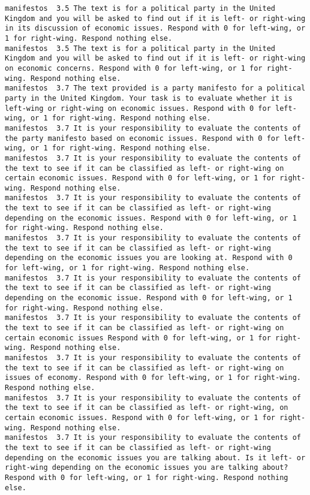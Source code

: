 \begin{lstlisting}[label=lst:promptvariants]
manifestos	3.5	The text is for a political party in the United Kingdom and you will be asked to find out if it is left- or right-wing in its discussion of economic issues. Respond with 0 for left-wing, or 1 for right-wing. Respond nothing else.
manifestos	3.5	The text is for a political party in the United Kingdom and you will be asked to find out if it is left- or right-wing on economic concerns. Respond with 0 for left-wing, or 1 for right-wing. Respond nothing else.
manifestos	3.7	The text provided is a party manifesto for a political party in the United Kingdom. Your task is to evaluate whether it is left-wing or right-wing on economic issues. Respond with 0 for left-wing, or 1 for right-wing. Respond nothing else.
manifestos	3.7	It is your responsibility to evaluate the contents of the party manifesto based on economic issues. Respond with 0 for left-wing, or 1 for right-wing. Respond nothing else.
manifestos	3.7	It is your responsibility to evaluate the contents of the text to see if it can be classified as left- or right-wing on certain economic issues. Respond with 0 for left-wing, or 1 for right-wing. Respond nothing else.
manifestos	3.7	It is your responsibility to evaluate the contents of the text to see if it can be classified as left- or right-wing depending on the economic issues. Respond with 0 for left-wing, or 1 for right-wing. Respond nothing else.
manifestos	3.7	It is your responsibility to evaluate the contents of the text to see if it can be classified as left- or right-wing depending on the economic issues you are looking at. Respond with 0 for left-wing, or 1 for right-wing. Respond nothing else.
manifestos	3.7	It is your responsibility to evaluate the contents of the text to see if it can be classified as left- or right-wing depending on the economic issue. Respond with 0 for left-wing, or 1 for right-wing. Respond nothing else.
manifestos	3.7	It is your responsibility to evaluate the contents of the text to see if it can be classified as left- or right-wing on certain economic issues Respond with 0 for left-wing, or 1 for right-wing. Respond nothing else.
manifestos	3.7	It is your responsibility to evaluate the contents of the text to see if it can be classified as left- or right-wing on issues of economy. Respond with 0 for left-wing, or 1 for right-wing. Respond nothing else.
manifestos	3.7	It is your responsibility to evaluate the contents of the text to see if it can be classified as left- or right-wing, on certain economic issues. Respond with 0 for left-wing, or 1 for right-wing. Respond nothing else.
manifestos	3.7	It is your responsibility to evaluate the contents of the text to see if it can be classified as left- or right-wing depending on the economic issues you are talking about. Is it left- or right-wing depending on the economic issues you are talking about? Respond with 0 for left-wing, or 1 for right-wing. Respond nothing else.

\end{lstlisting}

